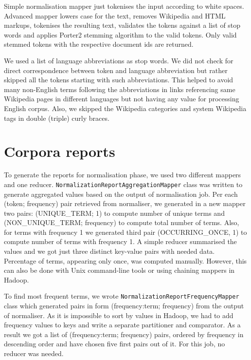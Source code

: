 \documentclass[a4paper, notitlepage]{report}
\begin{document}
Simple normalisation mapper just tokenises the input according to white spaces. Advanced mapper lowers case for the text, removes Wikipedia and HTML markups, tokenises the resulting text, validates the tokens against a list of stop words and applies Porter2 stemming algorithm to the valid tokens. Only valid stemmed tokens with the respective document ids are returned.

We used a list of language abbreviations as stop words. We did not check for direct correspondence between token and language abbreviation but rather skipped all the tokens starting with such abbreviations. This helped to avoid many non-English terms following the abbreviations in links referencing same Wikipedia pages in different languages but not having any value for processing English corpus. Also, we skipped the Wikipedia categories and system Wikipedia tags in double (triple) curly braces.

\section{Corpora reports}

To generate the reports for normalisation phase, we used two different mappers and one reducer. \lstinline{NormalizationReportAggregationMapper} class was written to generate aggregated values based on the output of normalisation job. Per each (token; frequency) pair retrieved from normaliser, we generated in a new mapper two pairs: (UNIQUE\_TERM; 1) to compute number of unique terms and (NON\_UNIQUE\_TERM; frequency) to compute total number of terms. Also, for terms with frequency 1 we generated third pair (OCCURRING\_ONCE, 1) to compute number of terms with frequency 1. A simple reducer summarised the values and we got just three distinct key-value pairs with needed data. Percentage of terms, appearing only once, was computed manually. However, this can also be done with Unix command-line tools or using chaining mappers in Hadoop.

To find most frequent terms, we wrote \lstinline{NormalizationReportFrequencyMapper} class which generated pairs in form (frequency:term; frequency) from the output of normaliser. As it is impossible to sort by values in Hadoop, we had to add frequency values to keys and write a separate partitioner and comparator. As a result we got a list of (frequency:term; frequency) pairs, ordered by frequency in descending order and have chosen five first pairs out of it. For this job, no reducer was needed.
\end{document}
